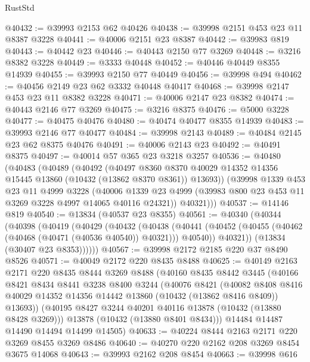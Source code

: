 \begin{lexlean}{RustStd}
\begin{coremodule}
@40432 := @39993 @2153 @62 @40426
@40438 := @39998 @2151 @453 @23 @11 @8387 @3228
@40441 := @40006 @2151 @23 @8387
@40442 := @39983 @819
@40443 := @40442 @23
@40446 := @40443 @2150 @77 @3269
@40448 := @3216 @8382 @3228
@40449 := @3333 @40448
@40452 := @40446 @40449 @8355 @14939
@40455 := @39993 @2150 @77 @40449
@40456 := @39998 @494
@40462 := @40456 @2149 @23 @62 @3332 @40448 @40417
@40468 := @39998 @2147 @453 @23 @11 @8382 @3228
@40471 := @40006 @2147 @23 @8382
@40474 := @40443 @2146 @77 @3269
@40475 := @3216 @8375
@40476 := @5000 @3228
@40477 := @40475 @40476
@40480 := @40474 @40477 @8355 @14939
@40483 := @39993 @2146 @77 @40477
@40484 := @39998 @2143
@40489 := @40484 @2145 @23 @62 @8375 @40476
@40491 := @40006 @2143 @23
@40492 := @40491 @8375
@40497 := @40014 @57 @365 @23 @3218 @3257
@40536 := @40480
    (@40483
      (@40489
        (@40492
          (@40497
            @8360
            @8370
            @40029
            @14352
            @14356
            @15445
            @13860
            (@10432 (@13862 @8370 @8361))
            @13693))
        (@39998
          @1339
          @453
          @23
          @11
          @4999
          @3228
          (@40006 @1339 @23 @4999 (@39983 @800 @23 @453 @11 @3269 @3228 @4997 @14065 @40116 @24321))
          @40321)))
@40537 := @14146 @819
@40540 := @13834 (@40537 @23 @8355)
@40561 := @40340
    (@40344
      (@40398
        (@40419
          (@40429
            (@40432
              (@40438
                (@40441 (@40452 (@40455 (@40462 (@40468 (@40471 (@40536 @40540)) @40321))) @40540))
                @40321))
            (@13834 (@30407 @23 @8353))))))
@40567 := @39998 @2172 @2185 @220 @37 @8490 @8526
@40571 := @40049 @2172 @220 @8435 @8488
@40625 := @40149
    @2163
    @2171
    @220
    @8435
    @8444
    @3269
    @8488
    (@40160
      @8435
      @8442
      @3445
      (@40166
        @8421
        @8434
        @8441
        @3238
        @8400
        @3244
        (@40076
          @8421
          (@40082
            @8408
            @8416
            @40029
            @14352
            @14356
            @14442
            @13860
            (@10432 (@13862 @8416 @8409))
            @13693))
        (@40195 @8427 @3244 @40201 @40116 @13878 (@10432 (@13880 @8428 @3269)))
        @13878
        (@10432 (@13880 @8401 @8434)))
      @14484
      @14487
      @14490
      @14494
      @14499
      @14505)
@40633 := @40224 @8444 @2163 @2171 @220 @3269 @8455 @3269 @8486
@40640 := @40270 @220 @2162 @208 @3269 @8454 @3675 @14068
@40643 := @39993 @2162 @208 @8454
@40663 := @39998
    @616

\end{coremodule}
\end{lexlean}
